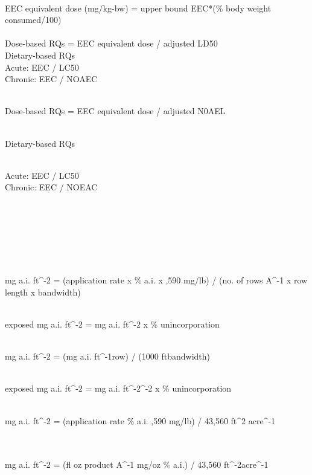 \\EEC \;equivalent\; dose (mg/kg-bw) = upper\; bound\; EEC*(\%\; body \;weight \;consumed/100)
\\
\\Dose-based\; RQs = EEC \;equivalent\; dose / adjusted \;LD50
\\Dietary-based \;RQs
\\Acute: EEC / LC50
    \\Chronic: EEC / NOAEC
\\

\\Dose-based \;RQs = EEC\; equivalent \;dose / adjusted\; N0AEL

\\Dietary-based \;RQs

    \\Acute: EEC / LC50
    \\Chronic: EEC / NOEAC


\\

\\

    \\

    \\mg \:a.i. \:ft^{-2} = (application  \:rate  \:x\: \%\: a.i. \:x ,590 \:mg/lb) / (no.\: of\: rows A^{-1} x\: row\: length\: x \:bandwidth)

    \\exposed mg a.i. ft^{-2} = mg a.i. ft^{-2} x\: \% \:unincorporation
   \\ 

    \\mg \:a.i.\: ft^{-2} = (mg\: a.i.\: ft^{-1}\:row) / (1000 \:ft\times  bandwidth)

    \\exposed\: mg\: a.i.\: ft^{-2} = mg\: a.i.\: ft^{-2}^{-2} x \:\% \:unincorporation
    \\

   \\ mg\: a.i. \:ft^{-2} = (application \:rate\: \times  \% a.i. ,590 mg/lb) / 43,560  \:ft^{2} acre^{-1}


\\
\\ mg a.i. ft^{-2} = (fl\:  oz \:product\: A^{-1} \:  mg/oz \times \% \: a.i.) / 43,560 ft^{-2}acre^{-1}
\\

